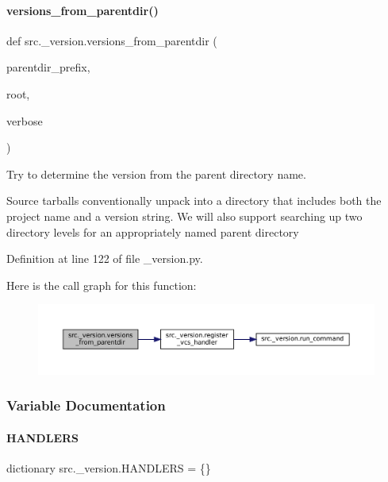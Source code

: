 \paragraph{\texorpdfstring{versions\+\_\+from\+\_\+parentdir()}{versions\_from\_parentdir()}}
{\footnotesize\ttfamily def src.\+\_\+version.\+versions\+\_\+from\+\_\+parentdir (\begin{DoxyParamCaption}\item[{}]{parentdir\+\_\+prefix,  }\item[{}]{root,  }\item[{}]{verbose }\end{DoxyParamCaption})}



Try to determine the version from the parent directory name. 

Source tarballs conventionally unpack into a directory that includes both the project name and a version string. We will also support searching up two directory levels for an appropriately named parent directory 

Definition at line 122 of file \+\_\+version.\+py.

Here is the call graph for this function\+:
\nopagebreak
\begin{figure}[H]
\begin{center}
\leavevmode
\includegraphics[width=350pt]{namespacesrc_1_1__version_a8ab6a4b8a5612bba9d90c884f50fce13_cgraph}
\end{center}
\end{figure}


\subsubsection{Variable Documentation}
\mbox{\label{namespacesrc_1_1__version_afc5a37c61f1815d00f27cf37fa2a08c6}} 
\paragraph{\texorpdfstring{H\+A\+N\+D\+L\+E\+RS}{HANDLERS}}
{\footnotesize\ttfamily dictionary src.\+\_\+version.\+H\+A\+N\+D\+L\+E\+RS = \{\}}



